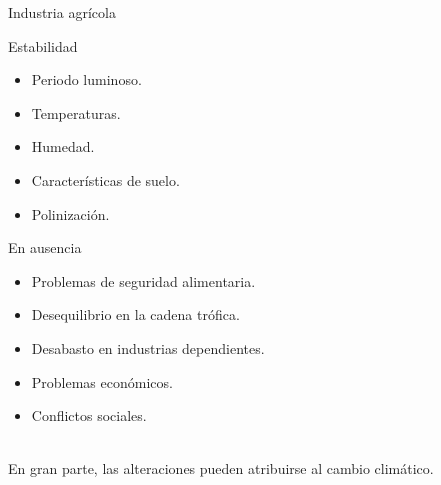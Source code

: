 \documentclass[aspectratio=169]{beamer}
\begin{document}
\begin{frame}{Industria agrícola}
	\vspace{-1cm}
	\begin{minipage}{0.5\textwidth}
		\begin{block}{Estabilidad}
			\begin{itemize}
				\item Periodo luminoso.
				\item Temperaturas.
				\item Humedad.
				\item Características de suelo.
				\item Polinización.
				
			\end{itemize}
		\end{block}
	\end{minipage}%
	\begin{minipage}{0.5\textwidth}
		\pause\begin{block}{En ausencia}
			\begin{itemize}
				\item Problemas de seguridad alimentaria.
				\item Desequilibrio en la cadena trófica.
				\item Desabasto en industrias dependientes.
				\item Problemas económicos.
				\item Conflictos sociales.
			\end{itemize}
		\end{block}
	\end{minipage}
	\pause
	\centering
	\,\\ \Large
	En gran parte, las alteraciones pueden atribuirse al cambio climático.
\end{frame}
\end{document}
